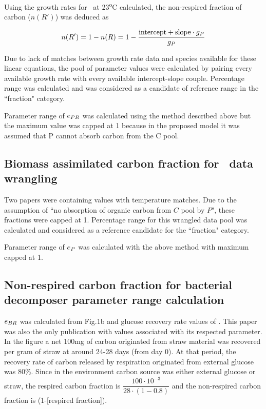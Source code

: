 \documentclass[../thesis.tex]{subfiles} %
\begin{document}
Using the growth rates for \phy\ at 23\textsuperscript{o}C calculated, the non-respired fraction of carbon ($n(R')$) was deduced as

\begin{equation}
    n(R') = 1-n(R) = 1-\dfrac{\text{intercept}+\text{slope}\cdot g_P}{g_P}
    \label{ePReqn}
\end{equation}

Due to lack of matches between growth rate data and species available for these linear equations, the pool of parameter values were calculated by pairing every available growth rate with every available intercept-slope couple.  Percentage range was calculated and was considered as a candidate of reference range in the ``fraction" category.

Parameter range of $e_{PR}$ was calculated using the method described above but the maximum value was capped at 1 because in the proposed model it was assumed that P cannot absorb carbon from the C pool.

\subsection{Biomass assimilated carbon fraction for \phy\ data wrangling}
Two papers were containing values with temperature matches.\autocite{j1989respiration,samejima1958heterotrophic}  Due to the assumption of ``no absorption of organic carbon from $C$ pool by $P$", these fractions were capped at 1.  Percentage range for this wrangled data pool was calculated and considered as a reference candidate for the ``fraction" category.

Parameter range of $e_P$ was calculated with the above method with maximum capped at 1.

\subsection{Non-respired carbon fraction for bacterial decomposer parameter range calculation}
$e_{BR}$ was calculated from Fig.1b and glucose recovery rate values of \autocite{cochran1988estimation}.  This paper was also the only publication with values associated with its respected parameter.  In the figure a net 100mg of carbon originated from straw material was recovered per gram of straw at around 24-28 days (from day 0).  At that period, the recovery rate of carbon released by respiration originated from external glucose was 80\%.  Since in the environment carbon source was either external glucose or straw, the respired carbon fraction is $\dfrac{100\cdot10^{-3}}{28\cdot(1-0.8)}$ and the non-respired carbon fraction is (1-[respired fraction]).
\end{document}
